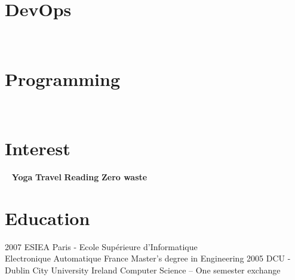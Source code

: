 \documentclass[]{friggeri-cv}
\begin{document}
\begin{aside}
~
~
~
\section{DevOps}
~  
~  
\section{Programming}
~  
    ~
   	\section{Interest}
   	~  
    	\textbf{Yoga}
    	\textbf{Travel} 
    	\textbf{Reading} 
    	\textbf{Zero waste}        	
    	~
\end{aside}
\section{Education}
\begin{entrylist}
	\entry
	{2007}
	{ESIEA Paris - Ecole Supérieure d’Informatique \\  Electronique Automatique}
	{France}
	{Master's degree in Engineering}
	\entry
	{2005}
	{DCU - Dublin City University}
	{Ireland}
	{Computer Science – One semester exchange}	
\end{entrylist}
\end{document}
